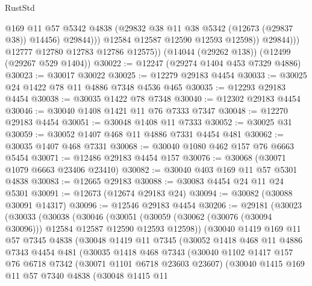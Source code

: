 \begin{lexlean}{RustStd}
\begin{coremodule}
{\begin{coremodule}
{{{{{{{{{{{{{{{{{{{{{{{{{{{{{{{{{{{{{{{{{{{{{{{{{{{{{{{{{{{{{{{{{{{{{{{{{{{{{{{{                        @169
                        @11
                        @57
                        @5342
                        @4838
                        (@29832 @38 @11 @38 @5342 (@12673 (@29837 @38)) @14456)
                        @29844)))
                  @12584
                  @12587
                  @12590
                  @12593
                  @12598))
              @29844)))
        @12777
        @12780
        @12783
        @12786
        @12575))
    (@14044 (@29262 @138))
    (@12499 (@29267 @529 @1404))
@30022 := @12247 (@29274 @1404 @453 @7329 @4886)
@30023 := @30017 @30022
@30025 := @12279 @29183 @4454
@30033 := @30025 @24 @1422 @78 @11 @4886 @7348 @4536 @465
@30035 := @12293 @29183 @4454
@30038 := @30035 @1422 @78 @7348
@30040 := @12302 @29183 @4454
@30046 := @30040 @1408 @1421 @11 @76 @7333 @7347
@30048 := @12270 @29183 @4454
@30051 := @30048 @1408 @11 @7333
@30052 := @30025 @31
@30059 := @30052 @1407 @468 @11 @4886 @7331 @4454 @481
@30062 := @30035 @1407 @468 @7331
@30068 := @30040 @1080 @462 @157 @76 @6663 @5454
@30071 := @12486 @29183 @4454 @157
@30076 := @30068 (@30071 @1079 @6663 @23406 @23410)
@30082 := @30040 @403 @169 @11 @57 @5301 @4838
@30083 := @12665 @29183
@30088 := @30083 @4454 @24 @11 @24 @5301
@30091 := @12673 (@12674 @29183 @24)
@30094 := @30082 (@30088 @30091 @14317)
@30096 := @12546 @29183 @4454
@30206 := @29181
    (@30023
      (@30033
        (@30038
          (@30046
            (@30051 (@30059 (@30062 (@30076 (@30094 @30096))) @12584 @12587 @12590 @12593 @12598))
            (@30040
              @1419
              @169
              @11
              @57
              @7345
              @4838
              (@30048
                @1419
                @11
                @7345
                (@30052
                  @1418
                  @468
                  @11
                  @4886
                  @7343
                  @4454
                  @481
                  (@30035
                    @1418
                    @468
                    @7343
                    (@30040
                      @1102
                      @1417
                      @157
                      @76
                      @6718
                      @7342
                      (@30071 @1101 @6718 @23603 @23607)
                      (@30040
                        @1415
                        @169
                        @11
                        @57
                        @7340
                        @4838
                        (@30048
                          @1415
                          @11
}}}}}}}}}}}}}}}}}}}}}}}}}}}}}}}}}}}}}}}}}}}}}}}}}}}}}}}}}}}}}}}}}}}}}}}}}}}}}}}}
\end{coremodule}}
\end{coremodule}
\end{lexlean}

